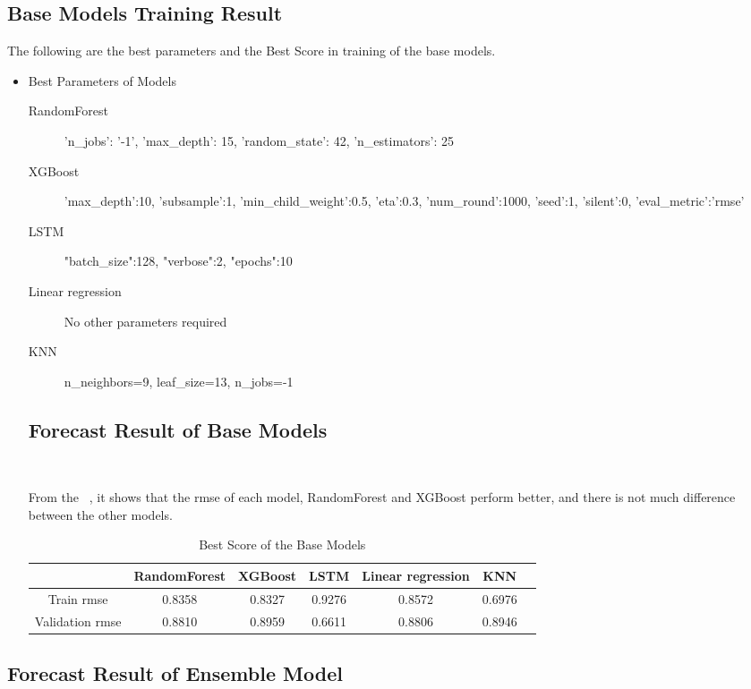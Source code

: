 \subsection{Base Models Training Result}

The following are the best parameters and 
the Best Score in training of 
the base models. 

\begin{itemize}
	\item Best Parameters of Models
	\begin{description}
		\item[RandomForest] 'n_jobs': '-1', 'max_depth': 15, 
		'random_state': 42, 'n_estimators': 25
		\item[XGBoost] 'max_depth':10, 
		'subsample':1,
		'min_child_weight':0.5,
		'eta':0.3, 
		'num_round':1000, 
		'seed':1,
		'silent':0,
		'eval_metric':'rmse'
		\item[LSTM] "batch_size":128,
		"verbose":2,
		"epochs":10
		\item[Linear regression] No other parameters required
		\item[KNN] n_neighbors=9, leaf_size=13, n_jobs=-1
	\end{description}


\subsection{Forecast Result of Base Models}
\

From the  ~,
it shows that the rmse of 
each model, RandomForest and XGBoost 
perform better, and there is not much 
difference between the other models.

\begin{table}[h]  \centering
	\caption{Best Score of the Base Models}
	\label{tbl:best_score_base_models_old}
	\begin{tabular}{ccccccc}
		\toprule
		& RandomForest & XGBoost & LSTM & Linear regression & KNN\\
		\midrule
		Train rmse & 0.8358 & 0.8327 & 0.9276 & 0.8572 & 0.6976\\
		Validation rmse & 0.8810 & 0.8959 & 0.6611 & 0.8806 & 0.8946\\
		\bottomrule
	\end{tabular}
\end{table}
\end{itemize}

\subsection{Forecast Result of Ensemble Model }
\

